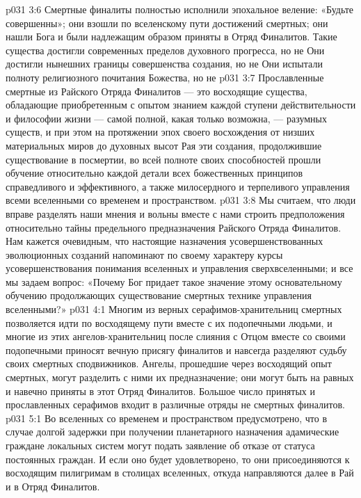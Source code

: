 \vs p031 3:6 \pc {}\bibnobreakspace Смертные финалиты полностью исполнили эпохальное веление: «Будьте совершенны»; они взошли по вселенскому пути достижений смертных; они нашли Бога и были надлежащим образом приняты в Отряд Финалитов. Такие существа достигли современных пределов духовного прогресса, но не  Они достигли нынешних границы совершенства создания, но не  Они испытали полноту религиозного почитания Божества, но не 
\vs p031 3:7 \pc {}\bibnobreakspace Прославленные смертные из Райского Отряда Финалитов --- это восходящие существа, обладающие приобретенным с опытом знанием каждой ступени действительности и философии жизни --- самой полной, какая только возможна, --- разумных существ, и при этом на протяжении эпох своего восхождения от низших материальных миров до духовных высот Рая эти создания, продолжившие существование в посмертии, во всей полноте своих способностей прошли обучение относительно каждой детали всех божественных принципов справедливого и эффективного, а также милосердного и терпеливого управления всеми вселенными со временем и пространством.
\vs p031 3:8 \pc Мы считаем, что люди вправе разделять наши мнения и вольны вместе с нами строить предположения относительно тайны предельного предназначения Райского Отряда Финалитов. Нам кажется очевидным, что настоящие назначения усовершенствованных эволюционных созданий напоминают по своему характеру курсы усовершенствования понимания вселенных и управления сверхвселенными; и все мы задаем вопрос: «Почему Бог придает такое значение этому основательному обучению продолжающих существование смертных технике управления вселенными?»
\vs p031 4:1 Многим из верных серафимов\hyp{}хранительниц смертных позволяется идти по восходящему пути вместе с их подопечными людьми, и многие из этих ангелов\hyp{}хранительниц после слияния с Отцом вместе со своими подопечными приносят вечную присягу финалитов и навсегда разделяют судьбу своих смертных сподвижников. Ангелы, прошедшие через восходящий опыт смертных, могут разделить с ними их предназначение; они могут быть на равных и навечно приняты в этот Отряд Финалитов. Большое число принятых и прославленных серафимов входит в различные отряды не смертных финалитов.
\vs p031 5:1 Во вселенных со временем и пространством предусмотрено, что в случае долгой задержки при получении планетарного назначения адамические граждане локальных систем могут подать заявление об отказе от статуса постоянных граждан. И если оно будет удовлетворено, то они присоединяются к восходящим пилигримам в столицах вселенных, откуда направляются далее в Рай и в Отряд Финалитов.
